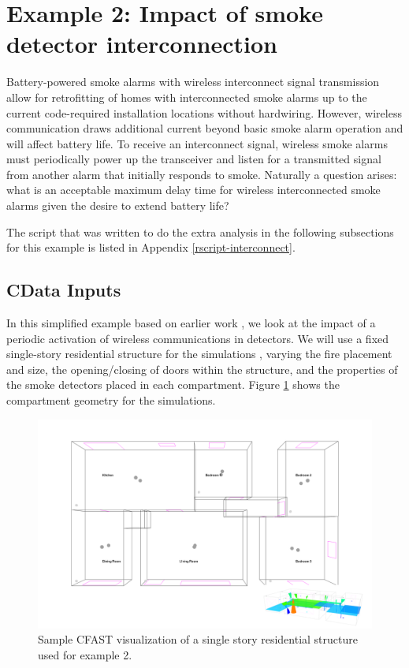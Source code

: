 \documentclass[12pt,twoside]{book}
\begin{document}
%
%

\section{Example 2: Impact of smoke detector interconnection}

Battery-powered smoke alarms with wireless interconnect signal transmission allow for retrofitting of homes with interconnected smoke alarms up to the current code-required installation locations without hardwiring. However, wireless communication draws additional current beyond basic smoke alarm operation and will affect battery life. To receive an interconnect signal, wireless smoke alarms must periodically power up the transceiver and listen for a transmitted signal from another alarm that initially responds to smoke. Naturally a question arises: what is an acceptable maximum delay time for wireless interconnected smoke alarms given the desire to extend battery life?

The script that was written to do the extra analysis in the following subsections for this example is listed in Appendix \ref{rscript-interconnect}.

\subsection{CData Inputs}
In this simplified example based on earlier work \cite{Cleary_2019}, we look at the impact of a periodic activation of wireless communications in detectors. We will use a fixed single-story residential structure for the simulations \cite{adrzykowski:2019}, varying the fire placement and size, the opening/closing of doors within the structure, and the properties of the smoke detectors placed in each compartment. Figure \ref{detector_geometry} shows the compartment geometry for the simulations.

\begin{figure}[h!]
\centering
\includegraphics[width=6.5in]{FIGURES/Detectors.png}
\caption{Sample CFAST visualization of a single story residential structure used for example 2.}
\label{detector_geometry}
\end{figure}
\end{document}
